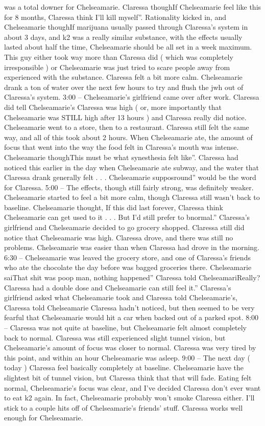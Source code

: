 \documentclass[12pt]{book}
\begin{document}
was a total downer for Chelseamarie. Claressa thoughIf Chelseamarie feel like this for 8 months, Claressa think I'll kill myself''. Rationality kicked in, and Chelseamarie thoughIf marijuana usually passed through Claressa's system in about 3 days, and k2 was a really similar substance, with the effects usually lasted about half the time, Chelseamarie should be all set in a week maximum. This guy either took way more than Claressa did ( which was completely irresponsible ) or Chelseamarie was just tried to scare people away from experienced with the substance. Claressa felt a bit more calm. Chelseamarie drank a ton of water over the next few hours to try and flush the jwh out of Claressa's system. 3:00 -- Chelseamarie's girlfriend came over after work. Claressa did tell Chelseamarie's Claressa was high ( or, more importantly that Chelseamarie was STILL high after 13 hours ) and Claressa really did notice. Chelseamarie went to a store, then to a restaurant. Claressa still felt the same way, and all of this took about 2 hours. When Chelseamarie ate, the amount of focus that went into the way the food felt in Claressa's mouth was intense. Chelseamarie thoughThis must be what synesthesia felt like''. Claressa had noticed this earlier in the day when Chelseamarie ate subway, and the water that Claressa drank generally felt . . .  Chelseamarie supposround'' would be the word for Claressa. 5:00 -- The effects, though still fairly strong, was definitely weaker. Chelseamarie started to feel a bit more calm, though Claressa still wasn't back to baseline. Chelseamarie thought, If this did last forever, Claressa think Chelseamarie can get used to it . . .  But I'd still prefer to bnormal.'' Claressa's girlfriend and Chelseamarie decided to go grocery shopped. Claressa still did notice that Chelseamarie was high. Claressa drove, and there was still no problems. Chelseamarie was easier than when Claressa had drove in the morning. 6:30 -- Chelseamarie was leaved the grocery store, and one of Claressa's friends who ate the chocolate the day before was bagged groceries there. Chelseamarie saiThat shit was poop man, nothing happened'' Claressa told ChelseamariReally? Claressa had a double dose and Chelseamarie can still feel it.'' Claressa's girlfriend asked what Chelseamarie took and Claressa told Chelseamarie's, Claressa told Chelseamarie Claressa hadn't noticed, but then seemed to be very fearful that Chelseamarie would hit a car when backed out of a parked spot. 8:00 -- Claressa was not quite at baseline, but Chelseamarie felt almost completely back to normal. Claressa was still experienced slight tunnel vision, but Chelseamarie's amount of focus was closer to normal. Claressa was very tired by this point, and within an hour Chelseamarie was asleep. 9:00 -- The next day ( today ) Claressa feel basically completely at baseline. Chelseamarie have the slightest bit of tunnel vision, but Claressa think that that will fade. Eating felt normal, Chelseamarie's focus was clear, and I've decided Claressa don't ever want to eat k2 again. In fact, Chelseamarie probably won't smoke Claressa either. I'll stick to a couple hits off of Chelseamarie's friends' stuff. Claressa works well enough for Chelseamarie.
\end{document}
